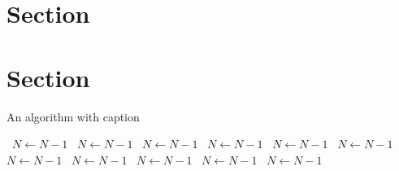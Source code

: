 \documentclass[a4paper]{article}
\begin{document}
\section{Section}

\section{Section}

\begin{algorithm}
\caption{An algorithm with caption}
\begin{algorithmic}
\    \State $N \gets N - 1$
\    \State $N \gets N - 1$
\    \State $N \gets N - 1$
\    \State $N \gets N - 1$
\    \State $N \gets N - 1$
\    \State $N \gets N - 1$
\    \State $N \gets N - 1$
\    \State $N \gets N - 1$
\    \State $N \gets N - 1$
\    \State $N \gets N - 1$
\    \State $N \gets N - 1$
\EndWhile
\end{algorithmic}
\end{algorithm}
\end{document}
